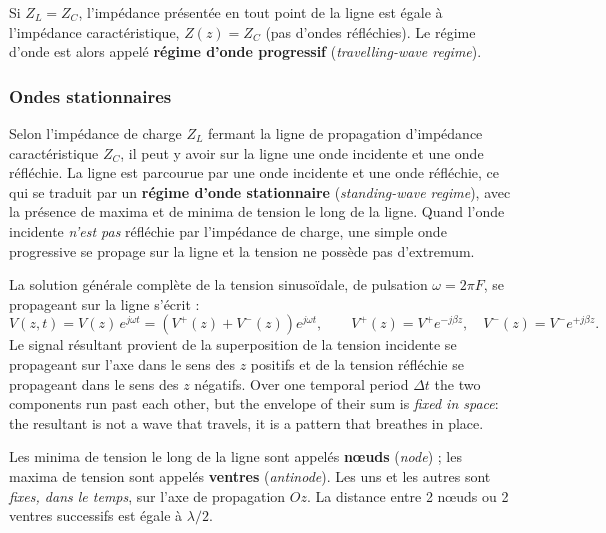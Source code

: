 \begin{corollary}
  Si $Z_L = Z_C$, l'impédance présentée en tout point de la ligne est égale à
  l'impédance caractéristique, $Z(z) = Z_C$ (pas d'ondes réfléchies). Le régime
  d'onde est alors appelé \textbf{régime d'onde progressif}
  (\textit{travelling-wave regime}).
\end{corollary}

\subsubsection{Ondes stationnaires}
Selon l'impédance de charge $Z_L$ fermant la ligne de propagation d'impédance
caractéristique $Z_C$, il peut y avoir sur la ligne une onde incidente et une
onde réfléchie. La ligne est parcourue par une onde incidente et une onde
réfléchie, ce qui se traduit par un \textbf{régime d'onde stationnaire}
(\textit{standing-wave regime}), avec la présence de maxima et de minima de
tension le long de la ligne. Quand l'onde incidente \emph{n'est pas} réfléchie
par l'impédance de charge, une simple onde progressive se propage sur la ligne
et la tension ne possède pas d'extremum.

La solution générale complète de la tension sinusoïdale, de pulsation
$\omega = 2\pi F$, se propageant sur la ligne s'écrit :
\[
  V(z,t) = V(z)\,e^{j\omega t}
         = \left(V^{+}(z) + V^{-}(z)\right)e^{j\omega t},
  \qquad
  V^{+}(z) = V^{+}e^{-j\beta z}, \quad V^{-}(z) = V^{-}e^{+j\beta z}.
\]
Le signal résultant provient de la superposition de la tension incidente se
propageant sur l'axe dans le sens des $z$ positifs et de la tension réfléchie
se propageant dans le sens des $z$ négatifs. Over one temporal period
$\Delta t$ the two components run past each other, but the envelope of their
sum is \emph{fixed in space}: the resultant is not a wave that travels, it is a
pattern that breathes in place.

\begin{definition}
  Les minima de tension le long de la ligne sont appelés \textbf{nœuds}
  (\textit{node}) ; les maxima de tension sont appelés \textbf{ventres}
  (\textit{antinode}). Les uns et les autres sont \emph{fixes, dans le temps},
  sur l'axe de propagation $Oz$. La distance entre 2 nœuds ou 2 ventres
  successifs est égale à $\lambda/2$.
\end{definition}

